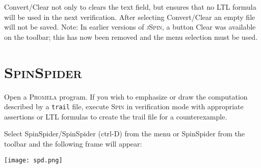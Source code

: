 \documentclass[11pt]{article}
\newcommand{\spn}{\textsc{Spin}}
\newcommand{\prm}{\textsc{Promela}}
\newcommand{\js}{\textsc{jSpin}}
\newcommand{\spd}{\textsc{SpinSpider}}
\newcommand{\p}[1]{\texttt{#1}}
\newcommand{\bu}[1]{\textsf{#1}}
\begin{document}
\bu{Convert/Clear} not only to clears the text field, but ensures that
no LTL formula will be used in the next verification. After selecting
\bu{Convert/Clear} an empty file will not be saved. Note: In earlier
versions of \js{}, a button \bu{Clear} was available on the toolbar;
this has now been removed and the menu selection must be used.

\section{\spd{}}
Open a \prm{} program. If you wish to emphasize or draw the computation
described by a \p{trail} file, execute \spn{} in verification mode with
appropriate assertions or LTL formulas to create the trail file for a counterexample.

Select \bu{SpinSpider/SpinSpider} (\bu{ctrl-D}) from the menu or \bu{SpinSpider}
from the toolbar and the following frame will appear:
\begin{center}
\texttt{[image: spd.png]}
\end{center}
\end{document}
